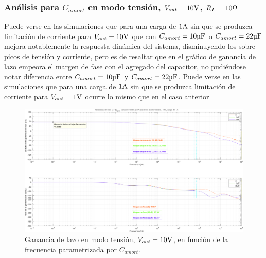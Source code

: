 \subsubsection{Análisis para $C_{amort}$ en modo tensión, $V_{out} = 10 \si[per-mode=symbol]{\volt}$, $R_{L} = 10 \si[per-mode=symbol]{\ohm}$}


Puede verse en las simulaciones que para una carga de $1 \si[per-mode=symbol]{\ampere} $ sin que se produzca limitación de corriente para $V_{out} = 10 \si[per-mode=symbol]{\volt}$ que con $C_{amort} = 10 \si[per-mode=symbol]{\micro\farad} $ o $C_{amort} = 22 \si[per-mode=symbol]{\micro\farad} $ mejora notablemente la respuesta dinámica del sistema, disminuyendo los sobre-picos de tensión y corriente, pero es de resaltar que en el gráfico de ganancia de lazo  empeora el margen de fase con el agregado del capacitor, no pudiéndose notar diferencia entre $C_{amort} = 10 \si[per-mode=symbol]{\micro\farad} $ y $C_{amort} = 22 \si[per-mode=symbol]{\micro\farad} $.
Puede verse en las simulaciones que para una carga de $1 \si[per-mode=symbol]{\ampere} $ sin que se produzca limitación de corriente para $V_{out} = 1 \si[per-mode=symbol]{\volt}$ ocurre lo mismo que en el caso anterior




\clearpage

\begin{figure}[H] %
\begin{center}
\includegraphics[width=1.1 \textwidth, angle=90]{./img/plots/loop/power_supply_CAMORT_LOOP_Modo1.png}
\caption{\label{fig:fig_power_supply_CAMORT_LOOP_Modo1}\footnotesize{Ganancia de lazo en modo tensión, $V_{out} = 10 \si[per-mode=symbol]{\volt}$, en función de la frecuencia parametrizada por $C_{amort}$.}}
\end{center}
\end{figure}


